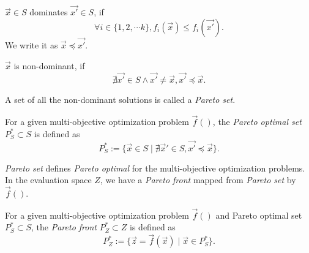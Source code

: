 \documentclass[12pt]{article}
\begin{document}
\begin{mydef}
\label{def:dominance}
$ \vec{x} \in S $ dominates $ \vec{x'} \in S $, if 
\begin{equation}
\label{eq:def_dominance}
\forall i \in \{ 1, 2, \cdots k \}, f_{i}(\vec{x}) \leq f_{i}(\vec{x'}).
\end{equation}
We write it as $ \vec{x} \preceq \vec{x'} $.

$ \vec{x}  $ is non-dominant, if 
\begin{equation}
\label{eq:def_nondominant}
\nexists \vec{x'} \in S \land \vec{x'} \neq \vec{x}, \vec{x'} \preceq \vec{x}.
\end{equation}
\end{mydef}

A set of all the non-dominant solutions is called a \emph{Pareto set}.
\begin{mydef}
\label{def:pareto_opt_set}
For a given multi-objective optimization problem $ \vec{f}() $, the \emph{Pareto optimal set} $ P^{*}_{S} \subset S $ is defined as
\begin{equation}
\label{eq:pa_opt_set}
P^{*}_{S} := \{ \vec{x} \in S \mid \nexists \vec{x}' \in S, \vec{x'} \preceq  \vec{x} \}.
\end{equation}

\end{mydef}

\emph{Pareto set} defines \emph{Pareto optimal} for the multi-objective optimization problems.
In the evaluation space $ Z $, we have a \emph{Pareto front} mapped from \emph{Pareto set} by $ \vec{f}() $.

\begin{mydef}
\label{def:pareto_front}
For a given multi-objective optimization problem $ \vec{f}() $ and Pareto optimal set $ P^{*}_{S} \subset S $, the \emph{Pareto front} $ P^{*}_{Z} \subset Z $ is defined as
\begin{equation}
\label{eq:pa_front}
P^{*}_{Z} := \{ \vec{z} = \vec{f}(\vec{x}) \mid \vec{x} \in P^{*}_{S} \}.
\end{equation}
\end{mydef}
\end{document}
